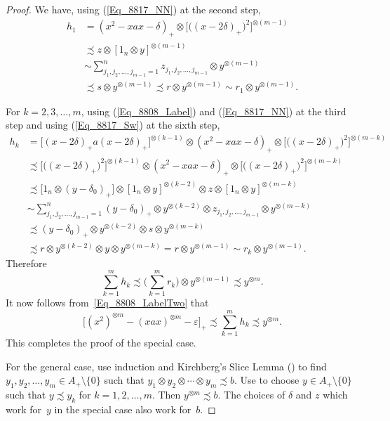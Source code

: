 \documentclass[11pt]{amsart}
\theoremstyle{plain}
\theoremstyle{definition}
\theoremstyle{remark}
\numberwithin{equation}{section}
\newcommand{\dt}{\delta}
\newcommand{\ep}{\varepsilon}
\begin{document}
\begin{proof}
We have, using (\ref{Eq_8817_NN}) at the second step,
%
\begin{align*}
h_1
& = ( x^2 - x a x - \dt )_{+}
  \otimes \big[ \bigl( (x - 2 \dt)_{+} \bigr)^2 \bigr]^{\otimes (m - 1 )}
\\
& \precsim z \otimes [1_n \otimes y]^{\otimes (m - 1 )}
\\
& \sim \sum_{j_1, j_2, \ldots, j_{m - 1} = 1}^n
   z_{j_1, j_2, \ldots, j_{m - 1}} \otimes y^{\otimes (m - 1 )}
\\
& \precsim s \otimes y^{\otimes (m - 1 )}
  \precsim r \otimes y^{\otimes (m - 1 )}
  \sim r_1 \otimes y^{\otimes (m - 1 )}.
\end{align*}
%

For $k = 2, 3, \ldots, m$,
using (\ref{Eq_8808_Label})
and (\ref{Eq_8817_NN}) at the third step
and using (\ref{Eq_8817_Sw}) at the sixth step,
%
\begin{align*}
h_k
& = \big[ (x - 2 \dt)_{+} a (x - 2 \dt)_{+} \bigr]^{\otimes (k - 1)}
  \otimes ( x^2 - x a x - \dt )_{+}
  \otimes
   \big[ \bigl( (x - 2 \dt)_{+} \bigr)^2 \bigr]^{\otimes (m - k )}
\\
& \precsim
   \big[ \bigl( (x - 2 \dt)_{+} \bigr)^2 \bigr]^{\otimes (k - 1)}
  \otimes ( x^2 - x a x - \dt )_{+}
  \otimes
    \big[ \bigl( (x - 2 \dt)_{+} \bigr)^2 \bigr]^{\otimes (m - k )}
\\
& \precsim \big[ 1_n \otimes (y - \dt_0)_{+} \bigr]
    \otimes [1_n \otimes y]^{\otimes (k - 2 )}
    \otimes z
    \otimes [1_n \otimes y]^{\otimes (m - k )}
\\
& \sim \sum_{j_1, j_2, \ldots, j_{m - 1} = 1}^n
   (y - \dt_0)_{+}
   \otimes y^{\otimes (k - 2 )}
   \otimes z_{j_1, j_2, \ldots, j_{m - 1}} \otimes y^{\otimes (m - k )}
\\
& \precsim (y - \dt_0)_{+}
   \otimes y^{\otimes (k - 2 )}
   \otimes s \otimes y^{\otimes (m - k )}
\\
& \precsim r
   \otimes y^{\otimes (k - 2 )}
   \otimes y \otimes y^{\otimes (m - k )}
  = r \otimes y^{\otimes (m - 1 )}
  \sim r_k \otimes y^{\otimes (m - 1 )}.
\end{align*}
%
Therefore
\[
\sum_{k = 1}^m h_k
 \precsim
    \Biggl( \sum_{k = 1}^m r_k \Biggr) \otimes y^{\otimes (m - 1 )}
 \precsim y^{\otimes m}.
\]
It now follows from~\eqref{Eq_8808_LabelTwo}
that
\[
\big[ (x^2)^{\otimes m} - (x a x)^{\otimes m} - \ep \bigr]_{+}
  \precsim \sum_{k = 1}^m h_k
  \precsim y^{\otimes m}.
\]
This completes the proof of the special case.

For the general case,
use induction and Kirchberg's Slice Lemma (\cite[Lemma~4.1.9]{Ro02})
to find $y_1, y_2, \ldots, y_m \in A_{+} \setminus \{ 0 \}$
such that $y_1 \otimes y_2 \otimes \cdots \otimes y_m \precsim b$.
Use \cite[Lemma 2.6]{Ph14}
to choose $y \in A_{+} \setminus \{ 0 \}$
such that $y \precsim y_k$ for $k = 1, 2, \ldots, m$.
Then $y^{\otimes m} \precsim b$.
The choices of $\dt$ and $z$ which work for~$y$
in the special case also work for~$b$.
\end{proof}
\end{document}
